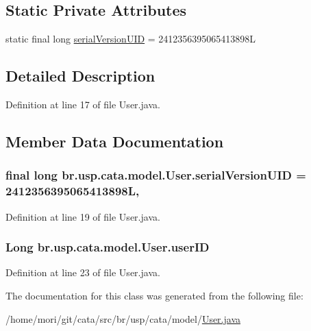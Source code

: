 \subsection*{Static Private Attributes}
\begin{DoxyCompactItemize}
\item 
static final long \hyperlink{classbr_1_1usp_1_1cata_1_1model_1_1_user_a7755646aad3007f791db452db670822f}{serial\+Version\+U\+I\+D} = 2412356395065413898\+L
\end{DoxyCompactItemize}


\subsection{Detailed Description}


Definition at line 17 of file User.\+java.



\subsection{Member Data Documentation}
\hypertarget{classbr_1_1usp_1_1cata_1_1model_1_1_user_a7755646aad3007f791db452db670822f}{
\subsubsection[{serial\+Version\+U\+I\+D}]{\setlength{\rightskip}{0pt plus 5cm}final long br.\+usp.\+cata.\+model.\+User.\+serial\+Version\+U\+I\+D = 2412356395065413898\+L\hspace{0.3cm}{\ttfamily [static]}, {\ttfamily [private]}}}\label{classbr_1_1usp_1_1cata_1_1model_1_1_user_a7755646aad3007f791db452db670822f}


Definition at line 19 of file User.\+java.

\hypertarget{classbr_1_1usp_1_1cata_1_1model_1_1_user_a2f478f971d5774aa5c1dc996c4cf5384}{
\subsubsection[{user\+I\+D}]{\setlength{\rightskip}{0pt plus 5cm}Long br.\+usp.\+cata.\+model.\+User.\+user\+I\+D\hspace{0.3cm}{\ttfamily [private]}}}\label{classbr_1_1usp_1_1cata_1_1model_1_1_user_a2f478f971d5774aa5c1dc996c4cf5384}


Definition at line 23 of file User.\+java.



The documentation for this class was generated from the following file\+:\begin{DoxyCompactItemize}
\item 
/home/mori/git/cata/src/br/usp/cata/model/\hyperlink{_user_8java}{User.\+java}\end{DoxyCompactItemize}
